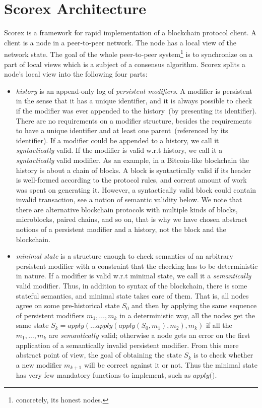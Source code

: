 
\section{Scorex Architecture}
\label{sec:scorex}

Scorex is a framework for rapid implementation of a blockchain protocol client. A client is a node in a peer-to-peer network. The node has a local view of the network state. The goal of the whole peer-to-peer system\footnote{concretely, its honest nodes.} is to synchronize on a part of local views which is a subject of a consensus algorithm. Scorex splits a node's local view into the following four parts: 

\begin{itemize}
\item{\em history} is an append-only log of {\em persistent modifiers}. A modifier is persistent in the sense that it has a unique identifier, and it is always possible to check if the modifier was ever appended to the history~(by presenting its identifier). There are no requirements on a modifier structure, besides the requirements to have a unique identifier and at least one parent~(referenced by its identifier). If a modifier could be appended to a history, we call it {\em syntactically} valid. If the modifier is valid w.r.t history, we call it a {\em syntactically} valid modifier. As an example, in a Bitcoin-like blockchain the history is about a chain of blocks. A block is syntactically valid if its header is well-formed according to the protocol rules, and corrent amount of work was spent on generating it. However, a syntactically valid block could contain invalid transaction, see a notion of semantic validity below. We note that there are alternative blockchain protocols with multiple kinds of blocks, microblocks, paired chains, and so on, that is why we have chosen abstract notions of a persistent modifier and a history, not the block and the blockchain.   
\item{\em minimal state} is a structure enough to check semantics of an arbitrary persistent modifier with a constraint that the checking has to be deterministic in nature. If a modifier is valid w.r.t minimal state, we call it a {\em semantically} valid modifier.
Thus, in addition to syntax of the blockchain, there is some stateful semantics, and minimal state takes care of them. That is, all nodes agree on some pre-historical state $S_0$ and then by applying the same sequence of persistent modifiers $m_1, \ldots, m_k$ in a deterministic way, all the nodes get the same state $S_k = apply(\ldots apply(apply(S_0, m_1), m_2), m_k)$ if all the $m_1, \ldots, m_k$ are {\em semantically} valid; otherwise a node gets an error on the first application of a semantically invalid persistent modifier. From this mere abstract point of view, the goal of obtaining the state $S_k$ is to check whether a new modifier $m_{k+1}$ will be correct against it or not. Thus the minimal state has very few mandatory functions to implement, such as $apply(\dot)$.

\end{itemize}

